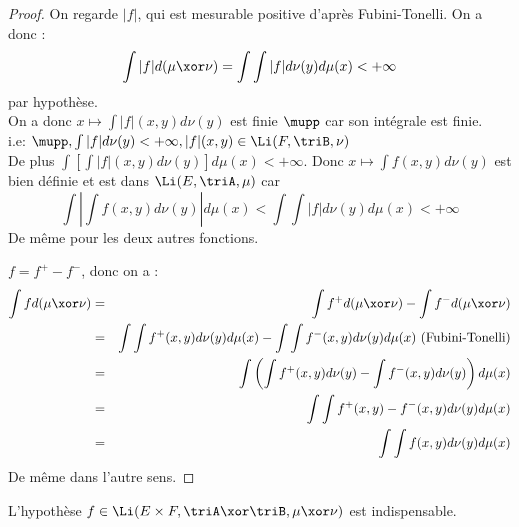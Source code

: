\begin{proof} %
	On regarde $|f|$, qui est mesurable positive d'après Fubini-Tonelli. On a donc :
	$$ \int |f| d (\mu \xor \nu) = \int \int |f| d \nu (y) d \mu (x) < + \infty$$
	par hypothèse. \\
	On a donc $ x   \mapsto \int |f|(x,y) d \nu(y)$ est finie $\mupp$ car son intégrale est finie. \\
	i.e: $\mupp, \int |f| d \nu(y) < + \infty, |f|(x,y) \in \Li(F, \triB, \nu)$ \\
	De plus $\int \left[ \int |f|(x,y) d    \nu(y)   \right] d \mu(x) < + \infty $.
	Donc $x \mapsto \int f (x,y) d \nu(y)$ est bien définie et est dans $\Li(E, \triA, \mu)$
	car $$\int \left| \int f (x,y) d \nu(y) \right| d \mu(x) < \int \int |f| d \nu(y) d \mu(x) < + \infty$$
	De même pour les deux autres fonctions.

	$f = f^+ - f^-$, donc on a :
	\begin{eqnarray*}
		\int f d (\mu \xor \nu) & = & \int f^+ d (\mu \xor \nu) - \int f^- d (\mu \xor \nu) \\
		& = & \int \int f^+(x,y) d \nu(y) d \mu(x) - \int \int f^-(x,y) d \nu(y) d \mu(x) \text{ (Fubini-Tonelli)} \\
		& = & \int \left( \int f^+(x,y) d \nu(y) - \int f^-(x,y) d \nu(y) \right) d \mu(x) \\
		&=& \int \int f^+(x,y) - f^-(x,y) d \nu(y) d \mu(x) \\
		&=& \int \int f(x,y) d \nu(y) d \mu(x)
	\end{eqnarray*}
	De même dans l'autre sens.
\end{proof}

\begin{remarque}
	L'hypothèse $f \in \Li(E \times F, \triA \xor \triB, \mu \xor \nu)$ est indispensable.
\end{remarque}
